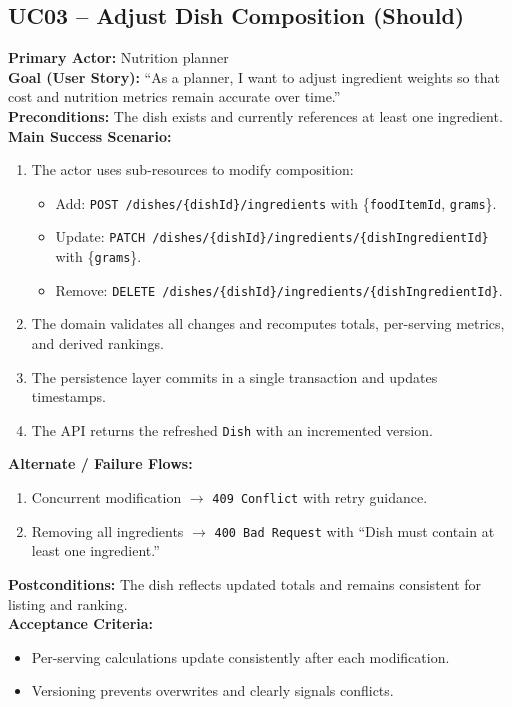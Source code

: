 \documentclass[11pt]{article}
\begin{document}
\subsection*{UC03 -- Adjust Dish Composition (Should)}
\textbf{Primary Actor:} Nutrition planner\\
\textbf{Goal (User Story):} ``As a planner, I want to adjust ingredient weights so that cost and nutrition metrics remain accurate over time.''\\
\textbf{Preconditions:} The dish exists and currently references at least one ingredient.\\
\textbf{Main Success Scenario:}
\begin{enumerate}[label=\arabic*.]
  \item The actor uses sub-resources to modify composition:
    \begin{itemize}[noitemsep]
      \item Add: \texttt{POST /dishes/\{dishId\}/ingredients} with \{\texttt{foodItemId}, \texttt{grams}\}.
      \item Update: \texttt{PATCH /dishes/\{dishId\}/ingredients/\{dishIngredientId\}} with \{\texttt{grams}\}.
      \item Remove: \texttt{DELETE /dishes/\{dishId\}/ingredients/\{dishIngredientId\}}.
    \end{itemize}
  \item The domain validates all changes and recomputes totals, per-serving metrics, and derived rankings.
  \item The persistence layer commits in a single transaction and updates timestamps.
  \item The API returns the refreshed \texttt{Dish} with an incremented version.
\end{enumerate}
\textbf{Alternate / Failure Flows:}
\begin{enumerate}[label=\arabic*F.]
  \item Concurrent modification $\rightarrow$ \texttt{409 Conflict} with retry guidance.
  \item Removing all ingredients $\rightarrow$ \texttt{400 Bad Request} with ``Dish must contain at least one ingredient.''
\end{enumerate}
\textbf{Postconditions:} The dish reflects updated totals and remains consistent for listing and ranking.\\
\textbf{Acceptance Criteria:}
\begin{itemize}[noitemsep]
  \item Per-serving calculations update consistently after each modification.
  \item Versioning prevents overwrites and clearly signals conflicts.
\end{itemize}
\end{document}
